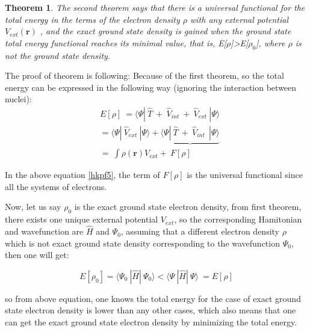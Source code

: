 \documentclass[a4paper, 12pt, titlepage,oneside,drop]{kthesis}
\newtheorem{thm}{Theorem}
\begin{document}
\begin{thm}
\label{hk2}
\noindent The second theorem says that there is a universal functional for the total energy in the terms of the electron density $\rho$ with any external potential $V_\textit{ext}(\textbf{r})$ ,
and the exact ground state density is gained when the ground state total energy functional reaches its minimal value, that is, E[$\rho$]>E[$\rho_0$], where $\rho$ is not the ground state density.
\end{thm}

\noindent The proof of theorem is following:
Because of the first theorem, so the total energy can be expressed in the following way (ignoring the interaction between nuclei):
\begin{equation}\label{hkpf5}\begin{split}
& E[\rho] \ =\langle \Psi  | \ \hat{T} \ + \ \hat{V}_\textit{int}  \ + \ \hat{V}_\textit{ext} \ | \Psi \rangle \\
&     = \langle \Psi  | \ \hat{V}_\textit{ext} \ | \Psi \rangle  + \underbrace{\langle \Psi  | \ \hat{T} \ + \ \hat{V}_\textit{int}  \ \ | \Psi \rangle}  \\
&     =   \ \int \rho(\textbf{r}) V_\textit{ext}  + \                    F[\rho] 
\end{split}
\end{equation}

\noindent In the above equation \ref{hkpf5}, the term of $F[\rho]$ is the universal functional since all the systems of electrons.

\noindent Now, let us say $\rho_0$ is the exact ground state electron density, from first theorem, there exists one unique external potential $V_\textit{ext}$, so 
the corresponding Hamitonian and wavefunction are $\hat{H}$ and $\Psi_0$, assuming that a different electron density $\rho$ which is not exact ground state density 
corresponding to the wavefunction $\Psi_0$, then one will get:

\begin{equation}
E[\rho_0] = \langle \Psi_0\ |\hat{H}|\ \Psi_0 \rangle 
          < \langle \Psi\ |\hat{H}|\ \Psi \rangle \
          = E[\rho]
\end{equation}

\noindent so from above equation, one knows the total energy for the case of exact ground state electron density is lower than any other cases, which also means that one can get 
the exact ground state electron density by minimizing the total energy.
\end{document}
